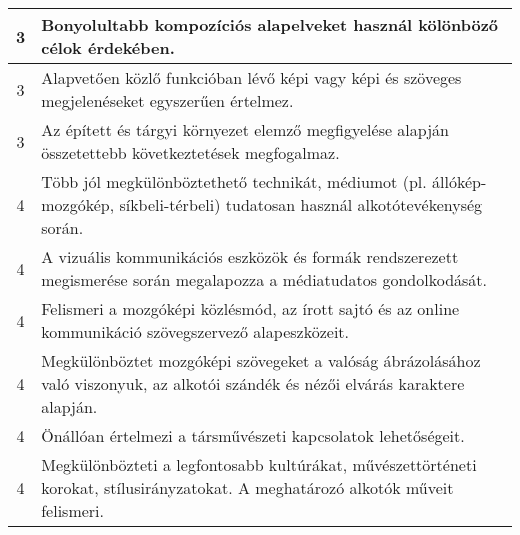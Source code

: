 \begin{longtable}{c | p{} }
                                
                                          3 &  Bonyolultabb kompozíciós alapelveket használ kölönböző célok érdekében. \\ \hline
                                          3 &  Alapvetően közlő funkcióban lévő képi vagy képi és szöveges megjelenéseket egyszerűen értelmez. \\ \hline
                                          3 &  Az épített és tárgyi környezet elemző megfigyelése alapján összetettebb következtetések megfogalmaz. \\ \hline
                                      
                                
                                          4 &  Több jól megkülönböztethető technikát, médiumot (pl. állókép-mozgókép, síkbeli-térbeli) tudatosan használ alkotótevékenység során. \\ \hline
                                          4 &  A vizuális kommunikációs eszközök és formák rendszerezett megismerése során megalapozza a médiatudatos gondolkodását. \\ \hline
                                          4 &  Felismeri a mozgóképi közlésmód, az írott sajtó és az online kommunikáció szövegszervező alapeszközeit. \\ \hline
                                          4 &  Megkülönböztet mozgóképi szövegeket a valóság ábrázolásához való viszonyuk, az alkotói szándék és nézői elvárás karaktere alapján. \\ \hline
                                          4 &  Önállóan értelmezi a társművészeti kapcsolatok lehetőségeit. \\ \hline
                                          4 &  Megkülönbözteti a legfontosabb kultúrákat, művészettörténeti korokat, stílusirányzatokat. A meghatározó alkotók műveit felismeri. \\ \hline
                                      
                        \end{longtable}
            \clearpage

